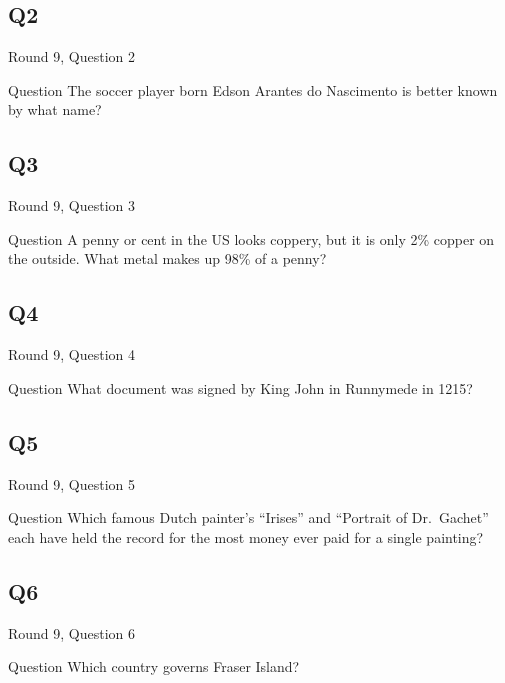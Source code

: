 \documentclass[11pt]{beamer}
\begin{document}
\subsection*{Q2}
\begin{frame}[t]{Round 9, Question 2}
\vspace{2em}
\begin{block}{Question}
The soccer player born Edson Arantes do Nascimento is better known by what name\@?
\end{block}
\end{frame}
    

\subsection*{Q3}
\begin{frame}[t]{Round 9, Question 3}
\vspace{2em}
\begin{block}{Question}
A penny or cent in the US looks coppery, but it is only 2\% copper on the outside. What metal makes up 98\% of a penny\@?
\end{block}
\end{frame}
    

\subsection*{Q4}
\begin{frame}[t]{Round 9, Question 4}
\vspace{2em}
\begin{block}{Question}
What document was signed by King John in Runnymede in 1215\@?
\end{block}
\end{frame}
    

\subsection*{Q5}
\begin{frame}[t]{Round 9, Question 5}
\vspace{2em}
\begin{block}{Question}
Which famous Dutch painter's ``Irises'' and ``Portrait of Dr.\ Gachet'' each have held the record for the most money ever paid for a single painting\@?
\end{block}
\end{frame}
    

\subsection*{Q6}
\begin{frame}[t]{Round 9, Question 6}
\vspace{2em}
\begin{block}{Question}
Which country governs Fraser Island\@?
\end{block}
\end{frame}
    
\end{document}
